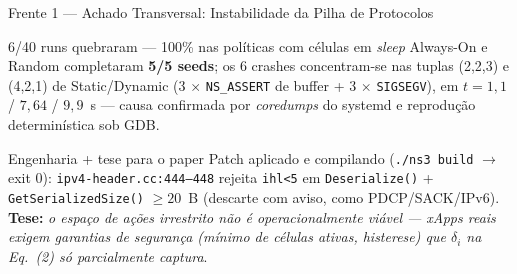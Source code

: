 \documentclass[aspectratio=169,10pt,xcolor={dvipsnames,table}]{beamer}
\begin{document}
\begin{frame}{Frente 1 --- Achado Transversal: Instabilidade da Pilha de Protocolos}
  \begin{alertblock}{6/40 runs quebraram --- 100\% nas políticas com células em \emph{sleep}}
    Always-On e Random completaram \textbf{5/5 seeds}; os 6 crashes
    concentram-se nas tuplas (2,2,3) e (4,2,1) de Static/Dynamic
    (3 $\times$ \texttt{NS\_ASSERT} de buffer + 3 $\times$ \texttt{SIGSEGV}),
    em $t = 1{,}1$ / $7{,}64$ / $9{,}9$~s --- causa confirmada por
    \emph{coredumps} do systemd e reprodução determinística sob GDB.
  \end{alertblock}
  \begin{center}
  \end{center}
  \begin{exampleblock}{Engenharia + tese para o paper}
    \small Patch aplicado e compilando (\texttt{./ns3 build} $\to$ exit 0):
    \texttt{ipv4-header.cc:444--448} rejeita \texttt{ihl<5} em
    \texttt{Deserialize()} + \texttt{GetSerializedSize()} $\ge 20$~B
    (descarte com aviso, como PDCP/SACK/IPv6). \textbf{Tese:} \emph{o espaço
    de ações irrestrito não é operacionalmente viável --- xApps reais exigem
    garantias de segurança (mínimo de células ativas, histerese) que
    $\delta_i$ na Eq.~(2) só parcialmente captura}.
  \end{exampleblock}
\end{frame}
\end{document}
